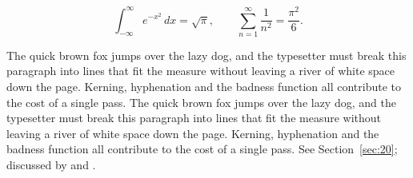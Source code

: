 \documentclass{article}
\begin{document}
\begin{equation}\label{eq:20}
\int_{-\infty}^{\infty} e^{-x^{2}}\,dx = \sqrt{\pi}, \qquad
\sum_{n=1}^{\infty} \frac{1}{n^{2}} = \frac{\pi^{2}}{6}.
\end{equation}

The quick brown fox jumps over the lazy dog, and the typesetter must break this paragraph into lines that fit the measure without leaving a river of white space down the page. Kerning, hyphenation and the badness function all contribute to the cost of a single pass. The quick brown fox jumps over the lazy dog, and the typesetter must break this paragraph into lines that fit the measure without leaving a river of white space down the page. Kerning, hyphenation and the badness function all contribute to the cost of a single pass. 
See Section~\ref{sec:20}; discussed by \textcite{k1} and \textcite{l3}.
\printbibliography
\end{document}
